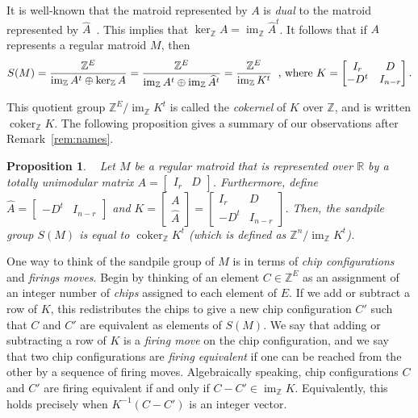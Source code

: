 \documentclass[12p]{amsart}
\numberwithin{equation}{section}
\theoremstyle{plain}
\newtheorem{prop}[thm]{Proposition}
\theoremstyle{definition}
\newcommand{\Z}{\mathbb {Z}}
\DeclareMathOperator{\im}{im}
\DeclareMathOperator{\coker}{coker}
\begin{document}
It is well-known that the matroid represented by $A$ is \emph{dual} to the matroid represented by $\widehat A$~\cite[Theorem 2.2.8]{Oxley}. This implies that $\ker_{\Z}  A = \im_{\Z} \widehat A^t$. It follows that if $A$ represents a regular matroid $M$, then 
\begin{equation}\label{eq:sandpile_def}S(M) = \frac{\Z^E}{\im_ {\Z} A^t\oplus \ker_ {\Z} A} = \frac{\Z^E}{\im_ {\Z} A^t\oplus \im_ {\Z} \widehat A^t} = \frac{\Z^E}{\im_{\Z}K^t}\hspace{.2 cm}\text{, where } K = \begin{bmatrix} I_r & D \\ -D^t & I_{n-r}\end{bmatrix}.\end{equation}

This quotient group $\Z^E/\im_{\Z}K^t$ is called the \emph{cokernel} of $K$ over $\mathbb Z$, and is written $\coker_\Z K$. The following proposition gives a summary of our observations after Remark~\ref{rem:names}. 

\begin{prop}~\cite[Definition 3.11]{Multijection}
     Let $M$ be a regular matroid that is represented over $\mathbb R$ by a totally unimodular matrix $A = \begin{bmatrix} I_r & D\end{bmatrix}$. Furthermore, define $\widehat A= \begin{bmatrix} -D^t & I_{n-r}\end{bmatrix}$ and $K = \begin{bmatrix} A \\ \widehat A\end{bmatrix} = \begin{bmatrix} I_r & D \\ -D^t & I_{n-r}\end{bmatrix}$. Then, the \emph{sandpile group} $S(M)$ is equal to $\coker_{\mathbb Z} K^t$ (which is defined as $\Z^n/\im_{\Z} K^t$). 
\end{prop}

One way to think of the sandpile group of $M$ is in terms of \emph{chip configurations} and \emph{firings moves}. Begin by thinking of an element $C \in \Z^E$ as an assignment of an integer number of \emph{chips} assigned to each element of $E$. If we add or subtract a row of $K$, this redistributes the chips to give a new chip configuration $C'$ such that $C$ and $C'$ are equivalent as elements of $S(M)$. We say that adding or subtracting a row of $K$ is a \emph{firing move} on the chip configuration, and we say that two chip configurations are \emph{firing equivalent} if one can be reached from the other by a sequence of firing moves. Algebraically speaking, chip configurations $C$ and $C'$ are firing equivalent if and only if $C - C' \in \im_{\Z} K$. Equivalently, this holds precisely when $K^{-1}(C-C')$ is an integer vector. 
\end{document}
